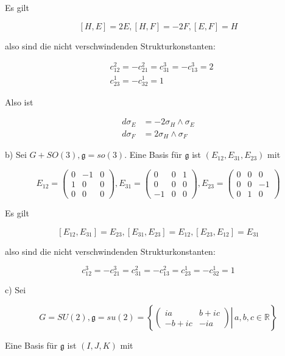 \documentclass[10pt, letterpaper]{article}
\begin{document}
Es gilt

$$
[H, E]=2 E,[H, F]=-2 F,[E, F]=H
$$

also sind die nicht verschwindenden Strukturkonstanten:

$$
\begin{aligned}
& c_{12}^{2}=-c_{21}^{2}=c_{31}^{3}=-c_{13}^{3}=2 \\
& c_{23}^{1}=-c_{32}^{1}=1
\end{aligned}
$$

Also ist

$$
\begin{aligned}
d \sigma_{E} & =-2 \sigma_{H} \wedge \sigma_{E} \\
d \sigma_{F} & =2 \sigma_{H} \wedge \sigma_{F}
\end{aligned}
$$

b) Sei $G+S O(3), \mathfrak{g}=s o(3)$. Eine Basis für $\mathfrak{g}$ ist $\left(E_{12}, E_{31}, E_{23}\right)$ mit

$$
E_{12}=\left(\begin{array}{ccc}
0 & -1 & 0 \\
1 & 0 & 0 \\
0 & 0 & 0
\end{array}\right), E_{31}=\left(\begin{array}{ccc}
0 & 0 & 1 \\
0 & 0 & 0 \\
-1 & 0 & 0
\end{array}\right), E_{23}=\left(\begin{array}{ccc}
0 & 0 & 0 \\
0 & 0 & -1 \\
0 & 1 & 0
\end{array}\right)
$$

Es gilt

$$
\left[E_{12}, E_{31}\right]=E_{23},\left[E_{31}, E_{23}\right]=E_{12},\left[E_{23}, E_{12}\right]=E_{31}
$$

also sind die nicht verschwindenden Strukturkonstanten:

$$
c_{12}^{3}=-c_{21}^{3}=c_{31}^{2}=-c_{13}^{2}=c_{23}^{1}=-c_{32}^{1}=1
$$

c) Sei

$$
G=S U(2), \mathfrak{g}=s u(2)=\left\{\left.\left(\begin{array}{cc}
i a & b+i c \\
-b+i c & -i a
\end{array}\right) \right\rvert\, a, b, c \in \mathbb{R}\right\}
$$

Eine Basis für $\mathfrak{g}$ ist $(I, J, K)$ mit
\end{document}
